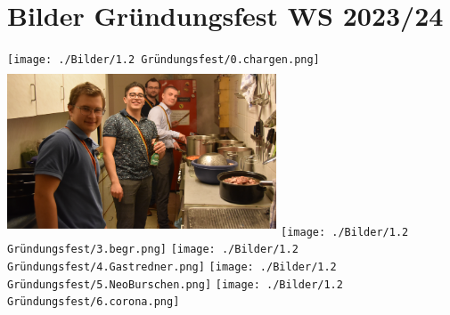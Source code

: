 \section{Bilder Gründungsfest WS 2023/24}

	
	\begin{figurehere}
		\texttt{[image: ./Bilder/1.2 Gründungsfest/0.chargen.png]}
		\vspace{5mm}
		\hspace{3mm}  %
			\includegraphics[width=80mm,height=50mm]{./Bilder/1.2 Gründungsfest/2.begrüss.png}	
		\texttt{[image: ./Bilder/1.2 Gründungsfest/3.begr.png]}
		\vspace{5mm}
		\hspace{3mm}
		    \texttt{[image: ./Bilder/1.2 Gründungsfest/4.Gastredner.png]} 
		    \texttt{[image: ./Bilder/1.2 Gründungsfest/5.NeoBurschen.png]} 
		    \vspace{5mm}
		    \hspace{3mm}
		    \texttt{[image: ./Bilder/1.2 Gründungsfest/6.corona.png]} 
		    
	\end{figurehere}
	


%
